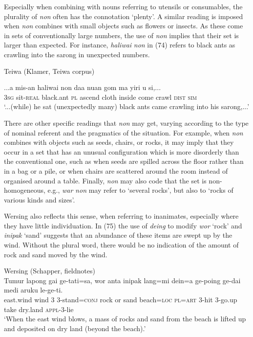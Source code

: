 Especially when combining with nouns referring to utensils or consumables, the plurality of \textit{non} often has the connotation `plenty'. A similar reading is imposed when \textit{non} combines with small objects such as flowers or insects. As these come in sets of conventionally large numbers, the use of \textit{non} implies that their set is larger than expected. For instance, \textit{haliwai} \textit{non} in (74) refers to black ants as crawling into the sarong in unexpected numbers.

Teiwa (Klamer, Teiwa corpus)

\ea%
\label{ex:74}
\gll ...a mis-an haliwai non daa nuan gom ma yiri  u si,... \\
  \textsc{3sg} sit-\textsc{real} black.ant \textsc{pl} ascend cloth inside come crawl \textsc{dist} \textsc{sim}  \\
\glt `...(while) he sat (unexpectedly many) black ants came crawling into his sarong,...'
\z






There are other specific readings that \textit{non} may get, varying according to the type of nominal referent and the pragmatics of the situation. For example, when \textit{non} combines with objects such as seeds, chairs, or rocks, it may imply that they occur in a set that has an unusual configuration which is more disorderly than the conventional one, such as when seeds are spilled across the floor rather than in a bag or a pile, or when chairs are scattered around the room instead of organised around a table. Finally, \textit{non} may also code that the set is non-homogeneous, e.g., \textit{war} \textit{non} may refer to `several rocks', but also to `rocks of various kinds and sizes'.

Wersing also reflects this sense, when referring to inanimates, especially where they have little individuation. In (75) the use of \textit{deing} to modify \textit{wor} `rock' and \textit{inipak} `sand' suggests that an abundance of these items are swept up by the wind. Without the plural word, there would be no indication of the amount of rock and sand moved by the wind.


\ea%
\label{ex:75}
Wersing (Schapper, fieldnotes)\\
\gll  Tumur lapong gai ge-tati=sa, wor anta inipak lang=mi dein=a ge-poing ge-dai medi aruku le-ge-ti.   \\
  east.wind wind 3 3-stand=\textsc{conj} rock or sand beach=\textsc{loc}   \textsc{pl=art} \textsc{3-}hit 3-go.up take dry.land \textsc{appl-3-}lie \\
\glt `When the east wind blows, a mass of rocks and sand from the beach is lifted up and deposited on dry land (beyond the beach).'
\z










